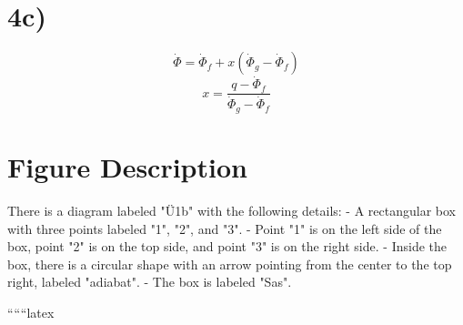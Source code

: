 

\section*{4c)}
\[
\dot{\Phi} = \dot{\Phi}_f + x (\dot{\Phi}_g - \dot{\Phi}_f)
\]
\[
x = \frac{q - \dot{\Phi}_f}{\dot{\Phi}_g - \dot{\Phi}_f}
\]

\section*{Figure Description}
There is a diagram labeled "Ü1b" with the following details:
- A rectangular box with three points labeled "1", "2", and "3".
- Point "1" is on the left side of the box, point "2" is on the top side, and point "3" is on the right side.
- Inside the box, there is a circular shape with an arrow pointing from the center to the top right, labeled "adiabat".
- The box is labeled "Sas".

``````latex